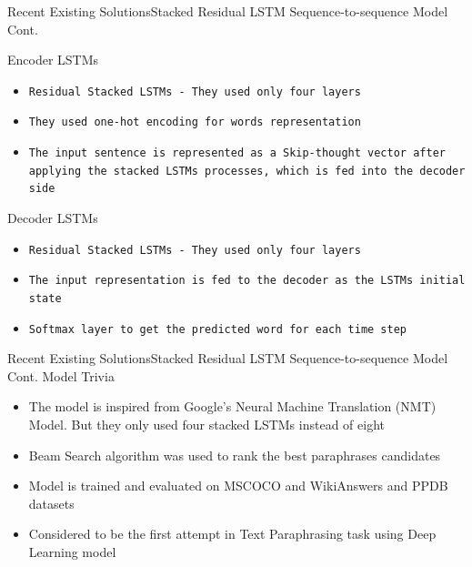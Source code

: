\documentclass[10pt]{beamer}
\begin{document}
\begin{frame}{Recent Existing Solutions}{Stacked Residual LSTM Sequence-to-sequence Model Cont.}
\begin{block}{Encoder LSTMs}
            \begin{itemize}
				\item {\tt Residual Stacked LSTMs - They used only four layers}
                \item {\tt They used one-hot encoding for words representation}
                \item {\tt The input sentence is represented as a Skip-thought vector after applying the stacked LSTMs processes, which is fed into the decoder side}
			\end{itemize}
	\end{block}

\begin{block}{Decoder LSTMs}
            \begin{itemize}
				\item {\tt Residual Stacked LSTMs - They used only four layers}
                \item {\tt The input representation is fed to the decoder as the LSTMs initial state}
                \item {\tt Softmax layer to get the predicted word for each time step}
			\end{itemize}
	\end{block}
\end{frame}

\begin{frame}{Recent Existing Solutions}{Stacked Residual LSTM Sequence-to-sequence Model Cont.}
Model Trivia
\begin{itemize}
	\item <1-> The model is inspired from Google's Neural Machine Translation (NMT) Model. But they only used four stacked LSTMs instead of eight
    \item <1-> Beam Search algorithm was used to rank the best paraphrases candidates
    \item <1-> Model is trained and evaluated on MSCOCO and WikiAnswers and PPDB datasets
	\item <1-> Considered to be the first attempt in Text Paraphrasing task using Deep Learning model
\end{itemize}
\end{frame}


\end{document}
